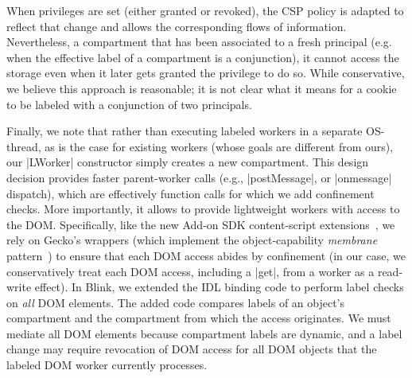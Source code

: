 When privileges are set (either granted or revoked), the CSP policy is adapted
to reflect that change and allows the corresponding flows of
information. Nevertheless, a compartment that has been associated to a fresh
principal (e.g. when the effective label of a compartment is a conjunction), it
cannot access the storage even when it later gets granted the privilege to do
so. While conservative, we believe this approach is reasonable; it is not clear
what it means for a cookie to be labeled with a conjunction of
two principals.

%

Finally, we note that rather than executing labeled workers in a
separate OS-thread, as is the case for existing workers (whose goals
are different from ours), our \js|LWorker| constructor simply creates a new
compartment. This design decision provides 
%
faster parent-worker calls (e.g.,
\js|postMessage|, or \js|onmessage| dispatch), which are effectively function
calls for which we add confinement checks. 
%
More importantly, it allows \sys{} to provide lightweight workers with access to the
DOM.
%
Specifically, like the new Add-on SDK content-script
extensions~\cite{addon-sdk}, we rely on Gecko's wrappers (which implement the
object-capability \emph{membrane}
pattern~\cite{miller2003paradigm,miller2006robust}) to ensure that each DOM
access abides by confinement (in our case, we conservatively treat each DOM
access, including a \js|get|, from a worker as a read-write effect).
%
In Blink, we extended the IDL binding code to perform label
checks on \emph{all} DOM elements.
%
The added code compares labels of an object's compartment and the compartment
from which the access originates.
%
We must mediate all DOM elements because compartment labels are dynamic, and a
label change may require revocation of DOM access for all DOM objects that the
labeled DOM worker currently processes.



